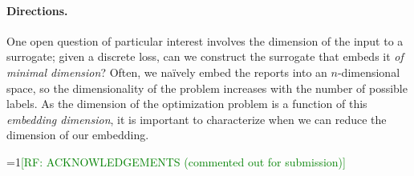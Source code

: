 \documentclass[12pt]{article}
\newcommand{\Comments}{1}
\newcommand{\mynote}[2]{\ifnum\Comments=1\textcolor{#1}{#2}\fi}
\newcommand{\raf}[1]{\mynote{green}{[RF: #1]}}
\newcommand{\reals}{\mathbb{R}}
\newtheorem{conjecture}{Conjecture}
\begin{document}
\paragraph{Directions.}
One open question of particular interest involves the dimension of the input to a surrogate; given a discrete loss, can we construct the surrogate that embeds it \emph{of minimal dimension}?
Often, we na\"ively embed the reports into an $n$-dimensional space, so the dimensionality of the problem increases with the number of possible labels.
As the dimension of the optimization problem is a function of this \emph{embedding dimension}, it is important to characterize when we can reduce the dimension of our embedding.




\raf{ACKNOWLEDGEMENTS (commented out for submission)}


\end{document}
